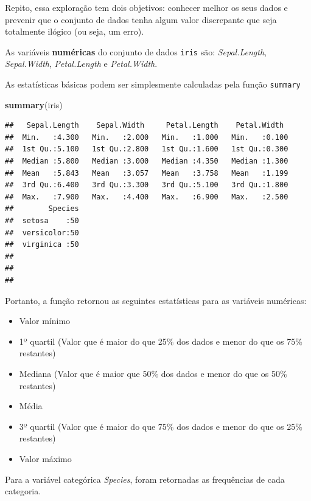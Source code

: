 \documentclass[
]{book}
\newenvironment{Shaded}{\begin{snugshade}}{\end{snugshade}}
\newcommand{\KeywordTok}[1]{\textcolor[rgb]{0.13,0.29,0.53}{\textbf{#1}}}
\newcommand{\NormalTok}[1]{#1}
\providecommand{\tightlist}{%
  \setlength{\itemsep}{0pt}\setlength{\parskip}{0pt}}
\begin{document}
Repito, essa exploração tem dois objetivos: conhecer melhor os seus
dados e prevenir que o conjunto de dados tenha algum valor discrepante
que seja totalmente ilógico (ou seja, um erro).

As variáveis \textbf{numéricas} do conjunto de dados \texttt{iris} são:
\emph{Sepal.Length}, \emph{Sepal.Width}, \emph{Petal.Length} e
\emph{Petal.Width}.

As estatísticas básicas podem ser simplesmente calculadas pela função
\texttt{summary}

\begin{Shaded}
\begin{Highlighting}[]
\KeywordTok{summary}\NormalTok{(iris)}
\end{Highlighting}
\end{Shaded}

\begin{verbatim}
##   Sepal.Length    Sepal.Width     Petal.Length    Petal.Width   
##  Min.   :4.300   Min.   :2.000   Min.   :1.000   Min.   :0.100  
##  1st Qu.:5.100   1st Qu.:2.800   1st Qu.:1.600   1st Qu.:0.300  
##  Median :5.800   Median :3.000   Median :4.350   Median :1.300  
##  Mean   :5.843   Mean   :3.057   Mean   :3.758   Mean   :1.199  
##  3rd Qu.:6.400   3rd Qu.:3.300   3rd Qu.:5.100   3rd Qu.:1.800  
##  Max.   :7.900   Max.   :4.400   Max.   :6.900   Max.   :2.500  
##        Species  
##  setosa    :50  
##  versicolor:50  
##  virginica :50  
##                 
##                 
## 
\end{verbatim}

Portanto, a função retornou as seguintes estatísticas para as variáveis
numéricas:

\begin{itemize}
\tightlist
\item
  Valor mínimo
\item
  1º quartil (Valor que é maior do que 25\% dos dados e menor do que os
  75\% restantes)
\item
  Mediana (Valor que é maior que 50\% dos dados e menor do que os 50\%
  restantes)
\item
  Média
\item
  3º quartil (Valor que é maior do que 75\% dos dados e menor do que os
  25\% restantes)
\item
  Valor máximo
\end{itemize}

Para a variável categórica \emph{Species}, foram retornadas as
frequências de cada categoria.
\end{document}

